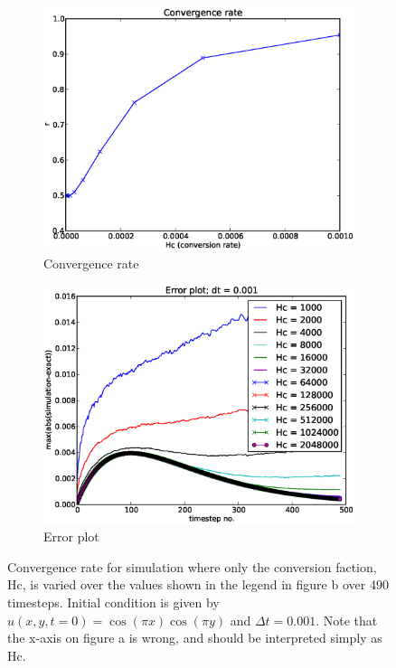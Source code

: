 \begin{figure}[H]
 \centering
 \begin{subfigure}[b]{0.48\textwidth}
 \includegraphics[width=\textwidth]{../doc/results/experiment_13122013_1519_convergenceTest_combinedSimulation_2d/results/ConvergenceTest.eps}
  \caption{Convergence rate}
  \label{convergence_test_ADI_2d:2d}
 \end{subfigure}
 \begin{subfigure}[b]{0.48\textwidth}
 \includegraphics[width=\textwidth]{../doc/results/experiment_13122013_1519_convergenceTest_combinedSimulation_2d/results/errorplot.eps}
  \caption{Error plot}
  \label{convergence_test_ADI_2d:1d}
 \end{subfigure}
 \caption[Convergence test for combined simulation]{Convergence rate for simulation where only the conversion faction, Hc, is varied over the values shown in the legend in figure b over 490 timesteps. Initial condition is given by $u(x,y,t=0) = \cos(\pi x)\cos(\pi y)$ and $\Delta t=0.001$. Note that the x-axis on figure a is wrong, and should be interpreted simply as Hc.}
 \label{convergence_test_ADI_2d}
\end{figure}


